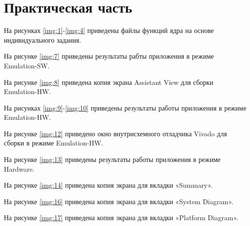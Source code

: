 \chapter{Практическая часть}

На рисунках \ref{img:1}-\ref{img:4} приведены файлы функций ядра на основе индивидуального задания.

\clearpage
{}

\clearpage
На рисунке \ref{img:7} приведены результаты рабты приложения в режиме Emulation-SW.



\clearpage
На рисунке \ref{img:8} приведена копия экрана Assistant View для сборки Emulation-HW.



\clearpage
На рисунках \ref{img:9}-\ref{img:10} приведены результаты работы приложения в режиме Emulation-HW.





\clearpage
На рисунке \ref{img:12} приведено окно внутрисхемного отладчика Vivado для сборки в режиме Emulation-HW.



\clearpage
На рисунке \ref{img:13} приведены результаты работы приложения в режиме Hardware.



\clearpage
На рисунке \ref{img:14} приведена копия экрана для вкладки «Summary».



\clearpage
На рисунке \ref{img:16} приведена копия экрана для вкладки «System Diagram».


\clearpage
На рисунке \ref{img:17} приведена копия экрана для вкладки «Platform Diagram».

